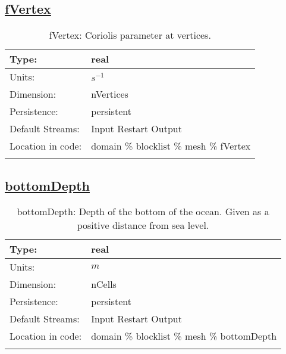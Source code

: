 \subsection[fVertex]{\hyperref[sec:var_tab_mesh]{fVertex}}
\label{subsec:var_sec_mesh_fVertex}
\begin{center}
\begin{longtable}{| p{2.0in} | p{4.0in} |}
        \hline 
        Type: & real \\
        \hline 
        Units: & $s^{-1}$ \\
        \hline 
        Dimension: & nVertices \\
        \hline 
        Persistence: & persistent \\
        \hline 
		 Default Streams: & Input Restart Output  \\
        \hline 
		 Location in code: & domain \% blocklist \% mesh \% fVertex \\
		 \hline 
    \caption{fVertex: Coriolis parameter at vertices.}
\end{longtable}
\end{center}
\subsection[bottomDepth]{\hyperref[sec:var_tab_mesh]{bottomDepth}}
\label{subsec:var_sec_mesh_bottomDepth}
\begin{center}
\begin{longtable}{| p{2.0in} | p{4.0in} |}
        \hline 
        Type: & real \\
        \hline 
        Units: & $m$ \\
        \hline 
        Dimension: & nCells \\
        \hline 
        Persistence: & persistent \\
        \hline 
		 Default Streams: & Input Restart Output  \\
        \hline 
		 Location in code: & domain \% blocklist \% mesh \% bottomDepth \\
		 \hline 
    \caption{bottomDepth: Depth of the bottom of the ocean. Given as a positive distance from sea level.}
\end{longtable}
\end{center}

